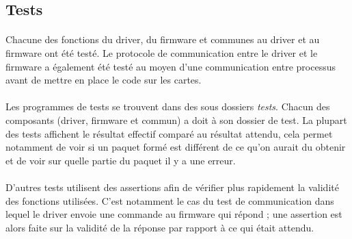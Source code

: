 \subsection{Tests}
\paragraph{}
Chacune des fonctions du driver, du firmware et communes au driver et au
firmware ont été testé. Le protocole de communication entre le driver et le
firmware a également été testé au moyen d'une communication entre processus
avant de mettre en place le code sur les cartes.
\paragraph{}
Les programmes de tests se trouvent dans des sous dossiers \emph{tests}.
Chacun des composants (driver, firmware et commun) a doit à son dossier de
test. La plupart des tests affichent le résultat effectif comparé au résultat
attendu, cela permet notamment de voir si un paquet formé est différent de ce
qu'on aurait du obtenir et de voir sur quelle partie du paquet il y a une
erreur.
\paragraph{}
D'autres tests utilisent des assertions afin de vérifier plus rapidement la
validité des fonctions utilisées. C'est notamment le cas du test de
communication dans lequel le driver envoie une commande au firmware qui
répond ; une assertion est alors faite sur la validité de la réponse par
rapport à ce qui était attendu.
